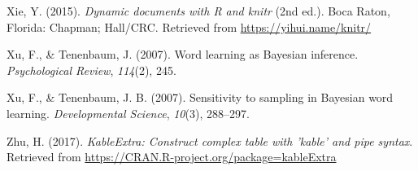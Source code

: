 \documentclass[english,floatsintext,man]{apa6}
\theoremstyle{definition}
\theoremstyle{definition}
\theoremstyle{remark}
\begin{document}
\hypertarget{ref-R-knitr}{}
Xie, Y. (2015). \emph{Dynamic documents with R and knitr} (2nd ed.).
Boca Raton, Florida: Chapman; Hall/CRC. Retrieved from
\url{https://yihui.name/knitr/}

\hypertarget{ref-xu2007word}{}
Xu, F., \& Tenenbaum, J. (2007). Word learning as Bayesian inference.
\emph{Psychological Review}, \emph{114}(2), 245.

\hypertarget{ref-xu2007}{}
Xu, F., \& Tenenbaum, J. B. (2007). Sensitivity to sampling in Bayesian
word learning. \emph{Developmental Science}, \emph{10}(3), 288--297.

\hypertarget{ref-R-kableExtra}{}
Zhu, H. (2017). \emph{KableExtra: Construct complex table with 'kable'
and pipe syntax}. Retrieved from
\url{https://CRAN.R-project.org/package=kableExtra}
\end{document}
